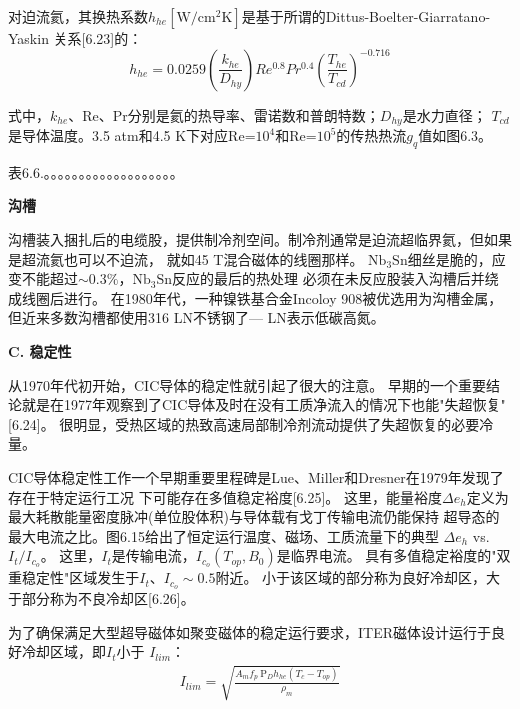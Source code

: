 对迫流氦，其换热系数$h_{he}[\mathrm{W/cm^2 K}]$是基于所谓的Dittus-Boelter-Giarratano-Yaskin
关系[6.23]的：
\begin{equation}%
h_{he}=0.0259(\frac{k_{he}}{D_{hy}})Re^{0.8}Pr^{0.4}(\frac{T_{he}}{T_{cd}})^{-0.716}
\end{equation}

式中，$k_{he}$、Re、Pr分别是氦的热导率、雷诺数和普朗特数；$D_{hy}$是水力直径；
$T_{cd}$是导体温度。3.5 atm和4.5 K下对应Re=$10^4$和Re=$10^5$的传热热流$g_q$值如图6.3。

表6.6.。。。。。。。。。。。。。。。。。。。

\textbf{沟槽}

沟槽装入捆扎后的电缆股，提供制冷剂空间。制冷剂通常是迫流超临界氦，但如果是超流氦也可以不迫流，
就如45 T混合磁体的线圈那样。
$\mathrm{Nb_3Sn}$细丝是脆的，应变不能超过$\sim 0.3\%$，$\mathrm{Nb_3Sn}$反应的最后的热处理
必须在未反应股装入沟槽后并绕成线圈后进行。
在1980年代，一种镍铁基合金Incoloy 908被优选用为沟槽金属，但近来多数沟槽都使用316 LN不锈钢了---
LN表示低碳高氮。

\textbf{C. 稳定性}

从1970年代初开始，CIC导体的稳定性就引起了很大的注意。
早期的一个重要结论就是在1977年观察到了CIC导体及时在没有工质净流入的情况下也能"失超恢复"[6.24]。
很明显，受热区域的热致高速局部制冷剂流动提供了失超恢复的必要冷量。

CIC导体稳定性工作一个早期重要里程碑是Lue、Miller和Dresner在1979年发现了存在于特定运行工况
下可能存在多值稳定裕度[6.25]。
这里，能量裕度$\Delta e_h$定义为最大耗散能量密度脉冲(单位股体积)与导体载有戈丁传输电流仍能保持
超导态的最大电流之比。图6.15给出了恒定运行温度、磁场、工质流量下的典型
$\Delta e_h$ vs. $I_t/I_{c_o}$。
这里，$I_t$是传输电流，$I_{c_o}(T_{op},B_0)$是临界电流。
具有多值稳定裕度的"双重稳定性"区域发生于$I_t、I_{c_o}\sim 0.5$附近。
小于该区域的部分称为良好冷却区，大于部分称为不良冷却区[6.26]。

为了确保满足大型超导磁体如聚变磁体的稳定运行要求，ITER磁体设计运行于良好冷却区域，即$I_t$小于
$I_{lim}$：
\begin{align}%
I_{lim}=\sqrt{\frac{A_mf_p\ \mathrm{P}_Dh_{he}(T_c-T_{op})}{\rho_m}}
\end{align}

